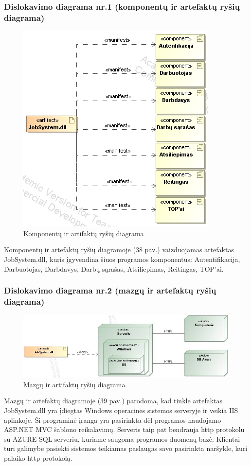 \documentclass{VUMIFPSkursinis}
\begin{document}
\subsubsection{Dislokavimo diagrama nr.1 (komponentų ir artefaktų ryšių diagrama)}
\begin{figure}[H]
\centering
\includegraphics[scale=0.8, frame]{img/fizinis(artefaktai).png}
\caption{Komponentų ir artifaktų ryšių diagrama}
\end{figure}
Komponentų ir artefaktų ryšių diagramoje (38 pav.) vaizduojamas artefaktas JobSystem.dll, kuris įgyvendina šiuos programos komponentus: Autentifikacija, Darbuotojas, Darbdavys, Darbų sąrašas, Atsiliepimas, Reitingas, TOP’ai.
\subsubsection{Dislokavimo diagrama nr.2 (mazgų ir artefaktų ryšių diagrama)}
\begin{figure}[H]
\centering
\includegraphics[width=\linewidth, frame]{img/fizinis2.png}
\caption{Mazgų ir artifaktų ryšių diagrama}
\end{figure}
Mazgų ir artefaktų diagramoje (39 pav.) parodoma, kad tinkle artefaktas JobSystem.dll yra įdiegtas Windows operacinės sistemos serveryje ir veikia IIS aplinkoje. Ši programinė įranga yra pasirinkta dėl programos naudojamo ASP.NET MVC šablono reikalavimų. Serveris taip pat bendrauja http protokolu su AZURE SQL serveriu, kuriame saugoma programos duomenų bazė. Klientai turi galimybe pasiekti sistemos teikiamas paslaugas savo pasirinkta naršykle, kuri palaiko http protokolą.
\end{document}
